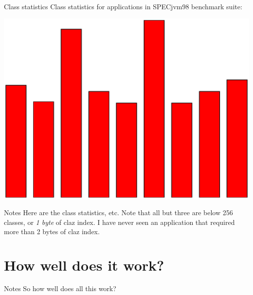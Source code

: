 \documentclass[%
pdf,
colorBG,
slideColor,
nototal,
oqe
]{prosper}
\newenvironment{talknotes}{\begin{slide}{Notes}\tiny}{\end{slide}}
\begin{document}
\begin{slide}{Class statistics}
Class statistics for applications in SPECjvm98 benchmark suite:
\begin{center}
\includegraphics[scale=0.5]{Figures/specclaz.eps}
\end{center}
\end{slide}

\begin{talknotes}
Here are the class statistics, etc.
Note that all but three are below 256 classes, or \emph{1 byte} of claz
index.  I have never seen an application that required more than
2 bytes of claz index.
\end{talknotes}

\part{How well does it work?}

\begin{talknotes}
So how well does all this work?
\end{talknotes}
\end{document}
